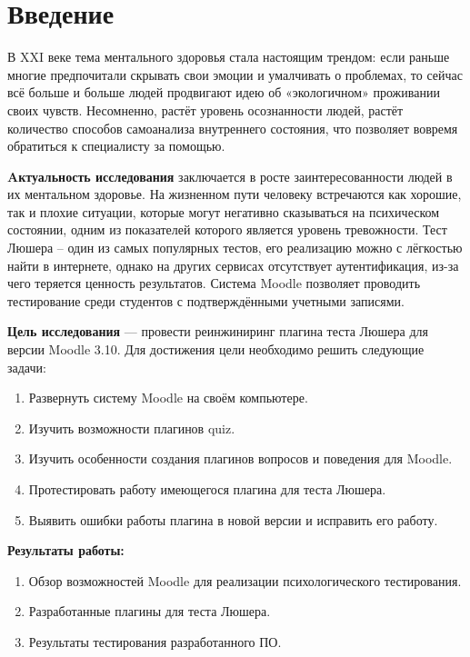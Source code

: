 \chapter*{Введение} %

В XXI веке тема ментального здоровья стала настоящим трендом: если раньше многие предпочитали скрывать свои эмоции и умалчивать о проблемах, то сейчас всё больше и больше людей продвигают идею об «экологичном» проживании своих чувств. Несомненно, растёт уровень осознанности людей, растёт количество способов самоанализа внутреннего состояния, что позволяет вовремя обратиться к специалисту за помощью. 


\textbf{Aктуальность исследования} заключается в росте заинтересованности людей в их ментальном здоровье. На жизненном пути человеку встречаются как хорошие, так и плохие ситуации, которые могут негативно сказываться на психическом состоянии, одним из показателей которого является уровень тревожности. Тест Люшера – один из самых популярных тестов, его реализацию можно с лёгкостью найти в интернете, однако на других сервисах отсутствует аутентификация, из-за чего теряется ценность результатов. Система Moodle позволяет проводить тестирование среди студентов с подтверждёнными учетными записями.



\textbf{Цель исследования} --- провести реинжиниринг плагина теста Люшера для версии Moodle 3.10. Для достижения цели необходимо решить следующие задачи:
\begin{enumerate}
	\item Развернуть систему Moodle на своём компьютере.
	\item Изучить возможности плагинов quiz.
	\item Изучить особенности создания плагинов вопросов и поведения для Moodle.
	\item Протестировать работу имеющегося плагина для теста Люшера.
	\item Выявить ошибки работы плагина в новой версии и исправить его работу.
\end{enumerate} 

\textbf{Результаты работы:}
\begin{enumerate}
	\item Обзор возможностей Moodle для реализации психологического тестирования.
	\item Разработанные плагины для теста Люшера.
	\item Результаты тестирования разработанного ПО.
\end{enumerate}


